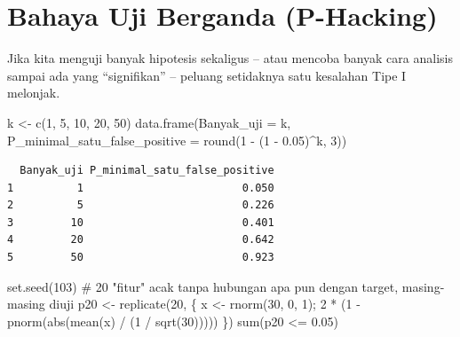 \documentclass[
  indonesian,
  letterpaper,
]{book}
\newenvironment{Shaded}{\begin{snugshade}}{\end{snugshade}}
\newcommand{\AttributeTok}[1]{\textcolor[rgb]{0.40,0.45,0.13}{#1}}
\newcommand{\CommentTok}[1]{\textcolor[rgb]{0.37,0.37,0.37}{#1}}
\newcommand{\DecValTok}[1]{\textcolor[rgb]{0.68,0.00,0.00}{#1}}
\newcommand{\FloatTok}[1]{\textcolor[rgb]{0.68,0.00,0.00}{#1}}
\newcommand{\FunctionTok}[1]{\textcolor[rgb]{0.28,0.35,0.67}{#1}}
\newcommand{\NormalTok}[1]{\textcolor[rgb]{0.00,0.23,0.31}{#1}}
\newcommand{\OtherTok}[1]{\textcolor[rgb]{0.00,0.23,0.31}{#1}}
\newcommand{\SpecialCharTok}[1]{\textcolor[rgb]{0.37,0.37,0.37}{#1}}
\begin{document}
\section{Bahaya Uji Berganda
(P-Hacking)}\label{bahaya-uji-berganda-p-hacking}

Jika kita menguji banyak hipotesis sekaligus -- atau mencoba banyak cara
analisis sampai ada yang ``signifikan'' -- peluang setidaknya satu
kesalahan Tipe I melonjak.

\begin{Shaded}
\begin{Highlighting}[]
\NormalTok{k }\OtherTok{\textless{}{-}} \FunctionTok{c}\NormalTok{(}\DecValTok{1}\NormalTok{, }\DecValTok{5}\NormalTok{, }\DecValTok{10}\NormalTok{, }\DecValTok{20}\NormalTok{, }\DecValTok{50}\NormalTok{)}
\FunctionTok{data.frame}\NormalTok{(}\AttributeTok{Banyak\_uji =}\NormalTok{ k, }\AttributeTok{P\_minimal\_satu\_false\_positive =} \FunctionTok{round}\NormalTok{(}\DecValTok{1} \SpecialCharTok{{-}}\NormalTok{ (}\DecValTok{1} \SpecialCharTok{{-}} \FloatTok{0.05}\NormalTok{)}\SpecialCharTok{\^{}}\NormalTok{k, }\DecValTok{3}\NormalTok{))}
\end{Highlighting}
\end{Shaded}

\begin{verbatim}
  Banyak_uji P_minimal_satu_false_positive
1          1                         0.050
2          5                         0.226
3         10                         0.401
4         20                         0.642
5         50                         0.923
\end{verbatim}

\begin{Shaded}
\begin{Highlighting}[]
\FunctionTok{set.seed}\NormalTok{(}\DecValTok{103}\NormalTok{)}
\CommentTok{\# 20 "fitur" acak tanpa hubungan apa pun dengan target, masing{-}masing diuji}
\NormalTok{p20 }\OtherTok{\textless{}{-}} \FunctionTok{replicate}\NormalTok{(}\DecValTok{20}\NormalTok{, \{ x }\OtherTok{\textless{}{-}} \FunctionTok{rnorm}\NormalTok{(}\DecValTok{30}\NormalTok{, }\DecValTok{0}\NormalTok{, }\DecValTok{1}\NormalTok{); }\DecValTok{2} \SpecialCharTok{*}\NormalTok{ (}\DecValTok{1} \SpecialCharTok{{-}} \FunctionTok{pnorm}\NormalTok{(}\FunctionTok{abs}\NormalTok{(}\FunctionTok{mean}\NormalTok{(x) }\SpecialCharTok{/}\NormalTok{ (}\DecValTok{1} \SpecialCharTok{/} \FunctionTok{sqrt}\NormalTok{(}\DecValTok{30}\NormalTok{))))) \})}
\FunctionTok{sum}\NormalTok{(p20 }\SpecialCharTok{\textless{}=} \FloatTok{0.05}\NormalTok{)}
\end{Highlighting}
\end{Shaded}
\end{document}
